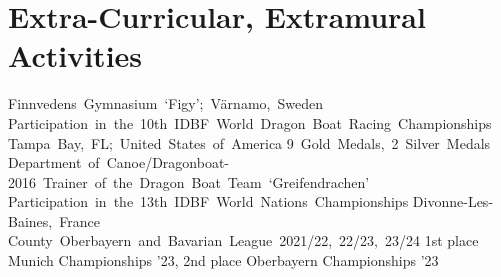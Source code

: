 \documentclass[11pt,a4paper]{moderncv}
\begin{document}
    \section{Extra-Curricular, Extramural Activities}
        {Finnvedens~Gymnasium~`Figy';~Värnamo,~Sweden}{}{}{}
        {Participation~in~the~10th~IDBF~World~Dragon~Boat~Racing~Championships\newline}{}%
        {Tampa~Bay,~FL;~United~States~of~America\newline}%
        {9~Gold~Medals,~2~Silver~Medals}
        {Department~of~Canoe/Dragonboat-2016~Trainer~of~the~Dragon~Boat~Team~`Greifendrachen'}{}{}{}{}
        {Participation~in~the~13th~IDBF~World~Nations~Championships\newline}{}%
        {Divonne-Les-Baines,~France}{}
        {County~Oberbayern~and~Bavarian~League~2021/22,~22/23,~23/24\newline}{}%
        {1st place Munich Championships '23, 2nd place Oberbayern Championships '23}{}%
\end{document}
